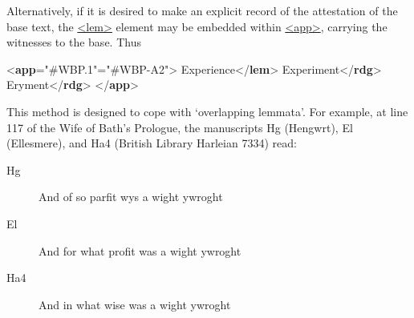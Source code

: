 Alternatively, if it is desired to make an explicit record of the attestation of the base text, the \hyperref[TEI.lem]{<lem>} element may be embedded within \hyperref[TEI.app]{<app>}, carrying the witnesses to the base. Thus \par\bgroup{}\exampleFont \begin{shaded}\noindent\mbox{}{<\textbf{app}\hspace*{1em}{from}="{\#WBP.1}"\hspace*{1em}{to}="{\#WBP-A2}">}\mbox{}\newline 
{}Experience{</\textbf{lem}>}\mbox{}\newline 
{}Experiment{</\textbf{rdg}>}\mbox{}\newline 
{}Eryment{</\textbf{rdg}>}\mbox{}\newline 
{</\textbf{app}>}\end{shaded}\egroup\par \par
This method is designed to cope with ‘overlapping lemmata’. For example, at line 117 of the Wife of Bath's Prologue, the manuscripts Hg (Hengwrt), El (Ellesmere), and Ha4 (British Library Harleian 7334) read: \begin{description}

\item[{Hg}]And of so parfit wys a wight ywroght
\item[{El}]And for what profit was a wight ywroght
\item[{Ha4}]And in what wise was a wight ywroght
\end{description} \par
